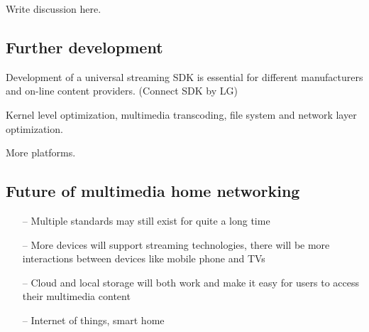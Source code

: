 
Write discussion here.

\subsection{Further development}
Development of a universal streaming SDK is essential for different
manufacturers and on-line content providers. (Connect SDK by LG)

Kernel level optimization, multimedia transcoding, file system and network layer
optimization.

More platforms.
\subsection{Future of multimedia home networking}
\begin{itemize}
\item[--] Multiple standards may still exist for quite a long time
\item[--] More devices will support streaming technologies, there will be more interactions between devices like mobile phone and TVs
\item[--] Cloud and local storage will both work and make it easy for users to access their multimedia content
\item[--] Internet of things, smart home
\end{itemize}